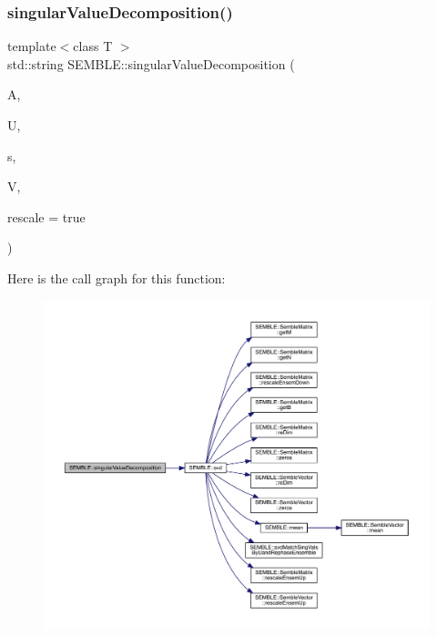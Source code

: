 \subsubsection{\texorpdfstring{singularValueDecomposition()}{singularValueDecomposition()}\hspace{0.1cm}{\footnotesize\ttfamily [1/2]}}
{\footnotesize\ttfamily template$<$class T $>$ \\
std\+::string S\+E\+M\+B\+L\+E\+::singular\+Value\+Decomposition (\begin{DoxyParamCaption}\item[{const \mbox{\hyperlink{structSEMBLE_1_1SembleMatrix}{Semble\+Matrix}}$<$ T $>$ \&}]{A,  }\item[{\mbox{\hyperlink{structSEMBLE_1_1SembleMatrix}{Semble\+Matrix}}$<$ T $>$ \&}]{U,  }\item[{\mbox{\hyperlink{structSEMBLE_1_1SembleVector}{Semble\+Vector}}$<$ double $>$ \&}]{s,  }\item[{\mbox{\hyperlink{structSEMBLE_1_1SembleMatrix}{Semble\+Matrix}}$<$ T $>$ \&}]{V,  }\item[{bool}]{rescale = {\ttfamily true} }\end{DoxyParamCaption})}

Here is the call graph for this function\+:
\nopagebreak
\begin{figure}[H]
\begin{center}
\leavevmode
\includegraphics[width=350pt]{d7/dfd/namespaceSEMBLE_a5f106e353054ed7ac809a9d21acdbd1c_cgraph}
\end{center}
\end{figure}
\mbox{\label{namespaceSEMBLE_ab1fb9dc27b7697519b6ae677ce6cc545}} 
